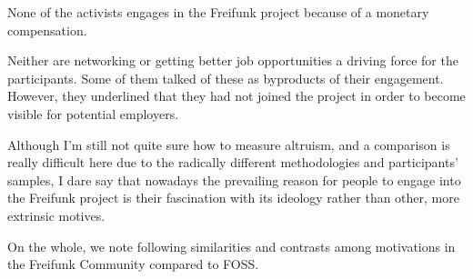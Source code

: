 None of the activists engages in the Freifunk project because of a monetary compensation.

Neither are networking or getting better job opportunities a driving force for the participants.
Some of them talked of these as byproducts of their engagement.
However, they underlined that they had not joined the project in order to become visible for potential employers.





Although I'm still not quite sure how to measure altruism, and a comparison is really difficult here due to the radically different methodologies and participants' samples, I dare say that nowadays the prevailing reason for people to engage into the Freifunk project is their fascination with its ideology rather than other, more extrinsic motives.



On the whole, we note following similarities and contrasts among motivations in the Freifunk Community compared to FOSS.

\begin{comment}
# Was ist am Projekt nicht so cool?

### Kommunikations/Diskussionskultur

* "Kommunikationskultur"
* "Arbeit im Team ist manchmal schwierig"
* "wenn Leute meinen, den richtigen Weg gefunden zu haben und den anderen aufzuzwingen und alles an sich reißen"
* "wenn sich Menschen richtig bekämpfen, hat das das Potenzial auch das Gesamtprojekt richtig runter zu ziehen"
* "treffen, die man viel redet und nichts passiert sind auch lästig"
* "leute, die in die presse sich als organisator_innen ausgeben und nur auf dem ruhm aus sind; trotzdem ist auch wichtig, dass jemand mit der presse und mit der stadt redet"

---

### Gender

* "genderthemen: community besteht größtenteils aus männern, die zu öffnen/erweiter funktioniert bis jetzt nicht so gut"

---
\end{comment}
